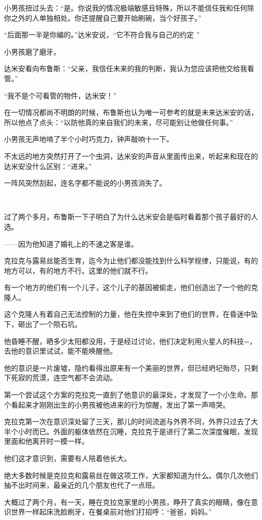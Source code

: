 \documentclass[../main]{subfiles}
\begin{document}
小男孩扭过头去：“是。你说我的情况极端敏感且特殊，所以不能信任我和任何除你之外的人单独相处。你还提醒自己要开始刷碗，当个好孩子。”

“后面那一半是你编的。”达米安说，“它不符合我与自己的约定 ”

小男孩磨了磨牙。

达米安看向布鲁斯：“父亲，我信任未来的我的判断，我认为您应该把他交给我看管。”

“我不是个可看管的物件，达米安！”

在一切情况都尚不明朗的时候，布鲁斯也认为唯一可参考的就是未来达米安的话，所以他点了点头：“以防他真的来自我们的未来，尽可能别让他做任何事。”

小男孩无声地啃了半个小时巧克力，钟声敲响十一下。

不太远的地方突然打开了一个虫洞，达米安的声音从里面传出来，听起来和现在的达米安没什么区别：“进来。”

一阵风突然刮起，连名字都不能说的小男孩消失了。

~\

过了两个多月，布鲁斯一下子明白了为什么达米安会是临时看着那个孩子最好的人选。

——因为他知道了婚礼上的不速之客是谁。

克拉克与露易丝能否生育，迄今为止他们都没能找到什么科学规律，只能说，有的地方可以，有的地方不行。这里的他们就不行。

有一个地方的他们有一个儿子，这个儿子的基因被偷走，他们创造出了一个他的克隆人。

这个克隆人有着自己无法控制的力量，他在失控中来到了他们的世界，在昏迷中坠下，砸出了一个陨石坑。

他昏睡不醒，晒多少太阳都没用，于是经过讨论，他们决定利用火星人的科技=，去他的意识里试试，能不能唤醒他。

他的意识是一片废墟，隐约看得出原来有一个美丽的世界，但已经坍圮殆尽，只剩下死寂的荒漠，连空气都不会流动。

第一个尝试这个方案的克拉克一直到了他意识的最深处，才发现了一个小生命。那个看起来才刚刚出生的小男孩被他进来的行为惊醒，发出了第一声啼哭。

克拉克第一次在意识深处留了三天，那儿的时间流逝与外界不同，外界只过去了大半个小时而已。外面的躯体依然在沉睡，克拉克于是进行了第二次深度催眠，发现里面和他离开时一模一样。

他们这才意识到，需要有人陪着他长大。

绝大多数时候是克拉克和露易丝在做这项工作，大家都知道为什么。偶尔几次他们抽不出时间来，最亲近的几个朋友也代了一点班。

大概过了两个月，有一天，睡在克拉克家里的小男孩，睁开了真实的眼睛，像在意识世界一样起床洗脸刷牙，在餐桌前对他们打招呼：“爸爸，妈妈。”
\end{document}
